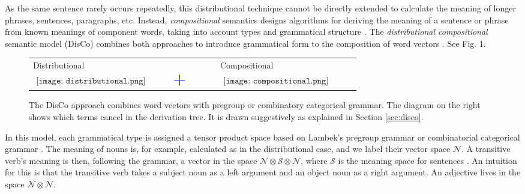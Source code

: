 As the same sentence rarely occurs repeatedly, this distributional technique cannot be directly extended to calculate the meaning of longer phrases, sentences, paragraphs, etc. Instead, \emph{compositional} semantics designs algorithms for deriving the meaning of a sentence or phrase from known meanings of component words,  taking into account types and grammatical structure \cite{lambek2008word}. The \emph{distributional compositional} semantic model (DisCo) combines both approaches to introduce grammatical form to the composition of word vectors \cite{clark2008compositional}. See Fig. 1. 

\begin{figure}[ht]
\label{fig:discofig}
\begin{center}
\begin{tabular}{m{0.3\linewidth}@{}m{0.1\linewidth}@{}m{0.3\linewidth}}
 Distributional & & Compositional \\
 $\begin{aligned}
 \texttt{[image: distributional.png]}
 \end{aligned}$
 & $\begin{aligned}\mbox{{\color{blue} \huge +}}\end{aligned}$ & 
  $\begin{aligned}
 \texttt{[image: compositional.png]}
 \end{aligned}$
\end{tabular}
\end{center}
\caption{The DisCo approach combines word vectors with pregroup or combinatory categorical grammar. The diagram on the right shows which terms cancel in the derivation tree.  It is drawn suggestively as explained in Section \ref{sec:disco}. }
\end{figure}

In this model, each grammatical type is assigned a tensor product space based on Lambek's pregroup grammar \cite{lambek2008word} or combinatorial categorical grammar \cite{hermann2013role}. The meaning of nouns is, for example, calculated as in the distributional case, and we label their vector space $\mathcal{N}$.  A transitive verb's meaning is then, following the grammar, a vector in the space $\mathcal{N}\otimes \mathcal{S} \otimes \mathcal{N}$, where $\mathcal{S}$ is the meaning space for sentences \cite{clark2008compositional}. An intuition for this is that the transitive verb takes a subject noun as a left argument and an object noun as a right argument. An adjective lives in the space $\mathcal{N}\otimes\mathcal{N}$.

